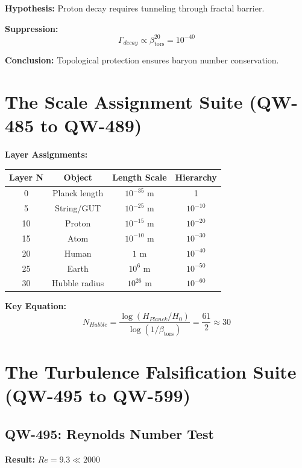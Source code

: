 \documentclass[11pt, a4paper]{article}
\theoremstyle{remark}
\newcommand{\betators}{\beta_{\text{tors}}}
\begin{document}
\textbf{Hypothesis:} Proton decay requires tunneling through fractal barrier.

\textbf{Suppression:}
\begin{equation}
\Gamma_{decay} \propto \betators^{20} = 10^{-40}
\end{equation}

\textbf{Conclusion:} Topological protection ensures baryon number conservation.

\section{The Scale Assignment Suite (QW-485 to QW-489)}

\textbf{Layer Assignments:}

\begin{center}
\begin{tabular}{|c|c|c|c|}
\hline
\textbf{Layer N} & \textbf{Object} & \textbf{Length Scale} & \textbf{Hierarchy} \\
\hline
0 & Planck length & $10^{-35}$ m & 1 \\
5 & String/GUT & $10^{-25}$ m & $10^{-10}$ \\
10 & Proton & $10^{-15}$ m & $10^{-20}$ \\
15 & Atom & $10^{-10}$ m & $10^{-30}$ \\
20 & Human & $1$ m & $10^{-40}$ \\
25 & Earth & $10^{6}$ m & $10^{-50}$ \\
30 & Hubble radius & $10^{26}$ m & $10^{-60}$ \\
\hline
\end{tabular}
\end{center}

\textbf{Key Equation:}
\begin{equation}
N_{Hubble} = \frac{\log(H_{Planck}/H_0)}{\log(1/\betators)} = \frac{61}{2} \approx 30
\end{equation}

\section{The Turbulence Falsification Suite (QW-495 to QW-599)}

\subsection{QW-495: Reynolds Number Test}

\textbf{Result:} $Re = 9.3 \ll 2000$
\end{document}
